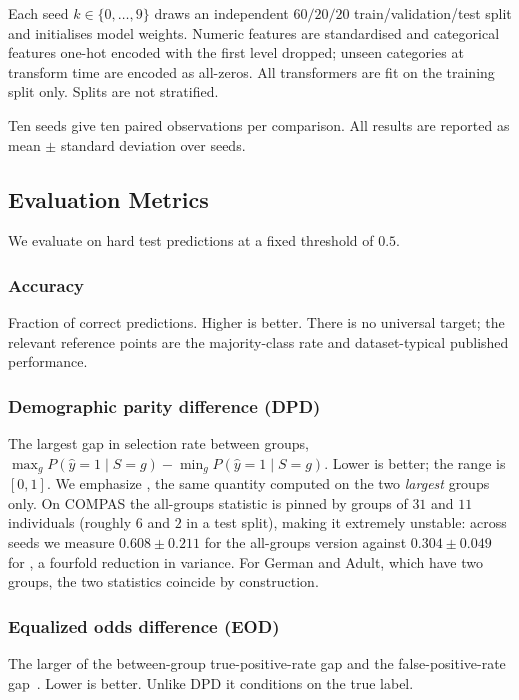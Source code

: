 Each seed $k \in \{0,\dots,9\}$ draws an independent $60/20/20$
train/validation/test split and initialises model weights. Numeric features
are standardised and categorical features one-hot encoded with the first level
dropped; unseen categories at transform time are encoded as all-zeros. All
transformers are fit on the training split only. Splits are not stratified.

Ten seeds give ten paired observations per comparison. All results are
reported as mean $\pm$ standard deviation over seeds.

\subsection{Evaluation Metrics}

We evaluate on hard test predictions at a fixed threshold of $0.5$.

\subsubsection{Accuracy} Fraction of correct predictions. Higher is better.
There is no universal target; the relevant reference points are the
majority-class rate and dataset-typical published performance.

\subsubsection{Demographic parity difference (DPD)}
The largest gap in selection rate between groups,
$\max_g P(\hat{y}=1 \mid S=g) - \min_g P(\hat{y}=1 \mid S=g)$. Lower is
better; the range is $[0,1]$. We emphasize \dpdtwo{}, the same quantity
computed on the two \emph{largest} groups only. On COMPAS the all-groups
statistic is pinned by groups of $31$ and $11$ individuals (roughly $6$ and
$2$ in a test split), making it extremely unstable: across seeds we measure
$0.608 \pm 0.211$ for the all-groups version against $0.304 \pm 0.049$ for
\dpdtwo{}, a fourfold reduction in variance. For German and Adult, which have
two groups, the two statistics coincide by construction.

\subsubsection{Equalized odds difference (EOD)}
The larger of the between-group true-positive-rate gap and the
false-positive-rate gap~\cite{hardt2016equality}. Lower is better. Unlike DPD
it conditions on the true label.

